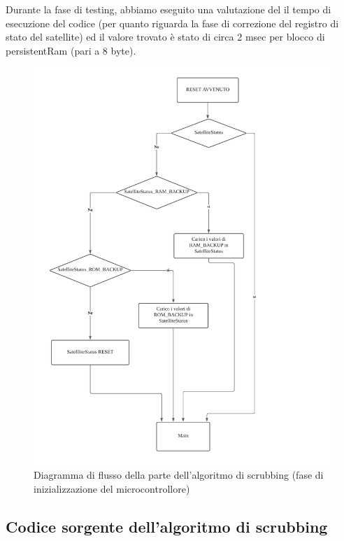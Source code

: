 \documentclass[LaM,binding=0.6cm]{../sapthesis}
\begin{document}
Durante la fase di testing, abbiamo eseguito una valutazione del il tempo di esecuzione del codice (per quanto riguarda la fase di correzione del registro di stato del satellite) ed il valore trovato è stato di circa 2 msec per blocco di persistentRam (pari a 8 byte).


\begin{figure}[htbp]
\centerline{\includegraphics[scale=0.33]{examples/DiagrammaFlussoScrubbing.jpeg}}
\caption{Diagramma di flusso della parte dell'algoritmo di scrubbing (fase di inizializzazione del microcontrollore)}
\label{fig}
\end{figure}

\clearpage

\subsection{Codice sorgente dell'algoritmo di scrubbing}
\end{document}
